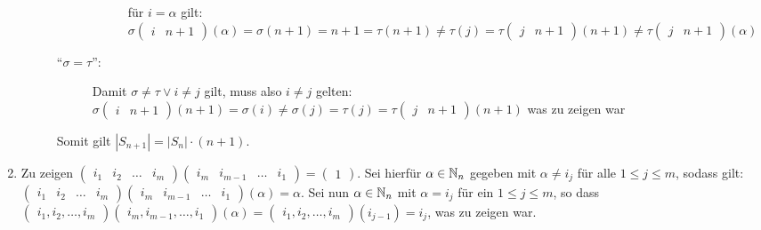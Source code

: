 \documentclass[sectionformat = aufgabe]{gadsescript}
\begin{document}
\begin{enumerate}[label=(\alph*)]
\begin{description}
\begin{description}
\begin{description}
								für $ i = \alpha $ gilt:
								$ \sigma \begin{pmatrix} i & n + 1 \end{pmatrix} ( \alpha) = \sigma(n + 1) = n + 1 = \tau (n + 1) \neq \tau (j) = \tau \begin{pmatrix} j & n + 1 \end{pmatrix} ( n + 1 ) \neq \tau \begin{pmatrix} j & n + 1 \end{pmatrix} (\alpha)  $
						\end{description}
					\item[``$ \sigma = \tau $'':] Damit $ \sigma \neq \tau \vee i \neq j $ gilt, muss also $ i \neq j $ gelten:
						$ \sigma \begin{pmatrix} i & n + 1 \end{pmatrix} ( n + 1 ) = \sigma(i) \neq \sigma(j) = \tau(j) = \tau \begin{pmatrix} j & n + 1 \end{pmatrix} (n + 1) $ was zu zeigen war
				\end{description}
				Somit gilt $ \left| S_{n + 1}  \right| = \left| S_n \right| \cdot (n + 1) $.
		\end{description}
	\item Zu zeigen $ \begin{pmatrix} i_1 & i_2 & \hdots & i_m \end{pmatrix} \begin{pmatrix} i_m & i_{m - 1} & \hdots & i_1 \end{pmatrix} = \begin{pmatrix} 1 \end{pmatrix}  $.
		Sei hierfür $ \alpha \in \mathbb{N} _n $ gegeben mit $ \alpha \neq i_j $ für alle $ 1 \leq j \leq m $, sodass gilt:  $ \begin{pmatrix} i_1 & i_2 & \hdots & i_m \end{pmatrix} \begin{pmatrix} i_m & i_{m - 1} & \hdots & i_1 \end{pmatrix} (\alpha) = \alpha $.
		Sei nun $ \alpha \in \mathbb{N} _n $ mit $ \alpha = i_j $ für ein $ 1 \leq j \leq m $, so dass
		$ \begin{pmatrix} i_1, i_2, \hdots, i_m \end{pmatrix} \begin{pmatrix} i_m, i_{m - 1} , \hdots, i_1 \end{pmatrix} (\alpha) = \begin{pmatrix} i_1, i_2, \hdots, i_m \end{pmatrix} (i_{j - 1} ) = i_j   $, was zu zeigen war.
\end{enumerate}
\end{document}
